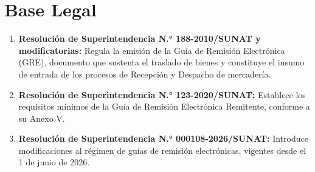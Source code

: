 \documentclass[11pt,letterpaper]{report}
\begin{document}
\section{Base Legal}
\begin{enumerate}
  \item \textbf{Resolución de Superintendencia N.° 188-2010/SUNAT y modificatorias:} Regula la emisión de la Guía de Remisión Electrónica (GRE), documento que sustenta el traslado de bienes y constituye el insumo de entrada de los procesos de Recepción y Despacho de mercadería.
  \item \textbf{Resolución de Superintendencia N.° 123-2020/SUNAT:} Establece los requisitos mínimos de la Guía de Remisión Electrónica Remitente, conforme a su Anexo V.
  \item \textbf{Resolución de Superintendencia N.° 000108-2026/SUNAT:} Introduce modificaciones al régimen de guías de remisión electrónicas, vigentes desde el 1 de junio de 2026.
\end{enumerate}
\end{document}
